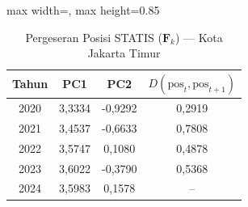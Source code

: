 \begin{table}[H]
\centering
\caption{Pergeseran Posisi STATIS ($\mathbf{F}_k$) --- Kota Jakarta Timur} \label{tab:app2jarak_statis_skor_kota_jakarta_timur}
\begin{adjustbox}{max width=\textwidth, max height=0.85\textheight}
\begin{tabular}{|c|c|c|c|}
\hline
\textbf{Tahun} & \textbf{PC1} & \textbf{PC2} & \textbf{$D(\text{pos}_t, \text{pos}_{t+1})$} \\
\hline
2020 & 3,3334 & -0,9292 & 0,2919 \\
2021 & 3,4537 & -0,6633 & 0,7808 \\
2022 & 3,5747 & 0,1080 & 0,4878 \\
2023 & 3,6022 & -0,3790 & 0,5368 \\
2024 & 3,5983 & 0,1578 & -- \\
\hline
\end{tabular}
\end{adjustbox}
\end{table}